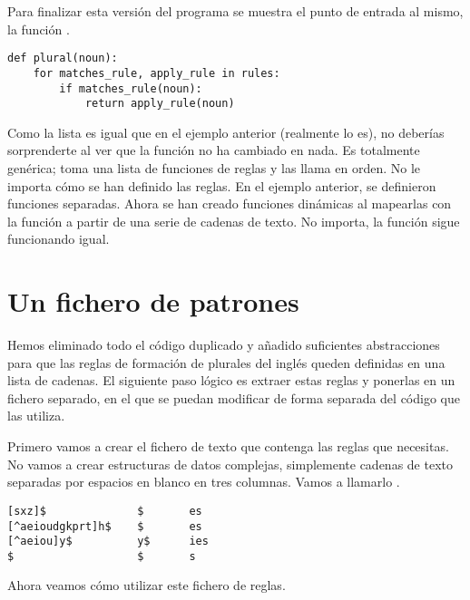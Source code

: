 Para finalizar esta versión del programa se muestra el punto de entrada al mismo, la función .

\noindent\begin{minipage}{\textwidth}
\begin{lstlisting}[mathescape=True]
def plural(noun):
    for matches_rule, apply_rule in rules:
        if matches_rule(noun):
            return apply_rule(noun)
\end{lstlisting}
\end{minipage}

Como la lista  es igual que en el ejemplo anterior (realmente lo es), no deberías sorprenderte al ver que la función  no ha cambiado en nada. Es totalmente genérica; toma una lista de funciones de reglas y las llama en orden. No le importa cómo se han definido las reglas. En el ejemplo anterior, se definieron funciones separadas. Ahora se han creado funciones dinámicas al mapearlas con la función  a partir de una serie de cadenas de texto. No importa, la función  sigue funcionando igual.

\section{Un fichero de patrones}

Hemos eliminado todo el código duplicado y añadido suficientes abstracciones para que las reglas de formación de plurales del inglés queden definidas en una lista de cadenas. El siguiente paso lógico es extraer estas reglas y ponerlas en un fichero separado, en el que se puedan modificar de forma separada del código que las utiliza.

Primero vamos a crear el fichero de texto que contenga las reglas que necesitas. No vamos a crear estructuras de datos complejas, simplemente cadenas de texto separadas por espacios en blanco en tres columnas. Vamos a llamarlo .

\noindent\begin{minipage}{\textwidth}
\begin{lstlisting}[mathescape=False]
[sxz]$              $       es
[^aeioudgkprt]h$    $       es
[^aeiou]y$          y$      ies
$                   $       s
\end{lstlisting}
\end{minipage}

Ahora veamos cómo utilizar este fichero de reglas.

